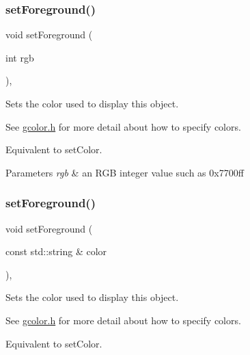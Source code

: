 \subsubsection{\texorpdfstring{set\+Foreground()}{setForeground()}\hspace{0.1cm}{\footnotesize\ttfamily [2/3]}}
{\footnotesize\ttfamily void set\+Foreground (\begin{DoxyParamCaption}\item[{int}]{rgb }\end{DoxyParamCaption})\hspace{0.3cm}{\ttfamily [virtual]}, {\ttfamily [inherited]}}



Sets the color used to display this object. 

See \mbox{\hyperlink{gcolor_8h_source}{gcolor.\+h}} for more detail about how to specify colors.

Equivalent to set\+Color.


\begin{DoxyParams}{Parameters}
{\em rgb} & an R\+GB integer value such as 0x7700ff \\
\hline
\end{DoxyParams}
\mbox{\label{classsgl_1_1GObject_af59209aeadea6dfc6d97a2d8531f50e1}} 
\subsubsection{\texorpdfstring{set\+Foreground()}{setForeground()}\hspace{0.1cm}{\footnotesize\ttfamily [3/3]}}
{\footnotesize\ttfamily void set\+Foreground (\begin{DoxyParamCaption}\item[{const std\+::string \&}]{color }\end{DoxyParamCaption})\hspace{0.3cm}{\ttfamily [virtual]}, {\ttfamily [inherited]}}



Sets the color used to display this object. 

See \mbox{\hyperlink{gcolor_8h_source}{gcolor.\+h}} for more detail about how to specify colors.

Equivalent to set\+Color.


